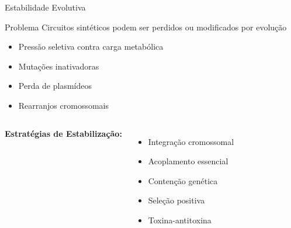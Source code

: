 \begin{frame}{Estabilidade Evolutiva}
\begin{block}{Problema}
Circuitos sintéticos podem ser perdidos ou modificados por evolução
\begin{itemize}
    \item Pressão seletiva contra carga metabólica
    \item Mutações inativadoras
    \item Perda de plasmídeos
    \item Rearranjos cromossomais
\end{itemize}
\end{block}

\vspace{0.3cm}

\begin{columns}
\textbf{Estratégias de Estabilização:}
\begin{itemize}
    \item Integração cromossomal
    \item Acoplamento essencial
    \item Contenção genética
    \item Seleção positiva
    \item Toxina-antitoxina
\end{itemize}

\begin{center}
\end{center}

\vspace{0.5cm}

\end{columns}
\end{frame}

